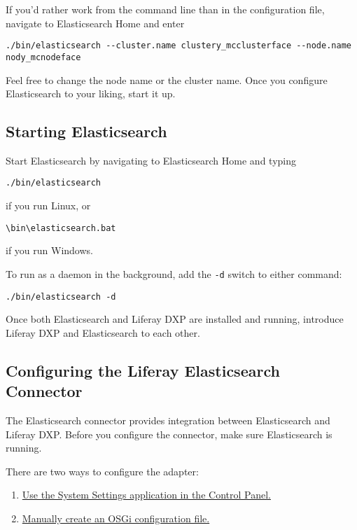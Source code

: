 If you'd rather work from the command line than in the configuration
file, navigate to Elasticsearch Home and enter

\begin{verbatim}
./bin/elasticsearch --cluster.name clustery_mcclusterface --node.name nody_mcnodeface
\end{verbatim}

Feel free to change the node name or the cluster name. Once you
configure Elasticsearch to your liking, start it up.

\subsection{Starting Elasticsearch}\label{starting-elasticsearch-1}

Start Elasticsearch by navigating to Elasticsearch Home and typing

\begin{verbatim}
./bin/elasticsearch
\end{verbatim}

if you run Linux, or

\begin{verbatim}
\bin\elasticsearch.bat
\end{verbatim}

if you run Windows.

To run as a daemon in the background, add the \texttt{-d} switch to
either command:

\begin{verbatim}
./bin/elasticsearch -d
\end{verbatim}

Once both Elasticsearch and Liferay DXP are installed and running,
introduce Liferay DXP and Elasticsearch to each other.

\subsection{Configuring the Liferay Elasticsearch
Connector}\label{configuring-the-liferay-elasticsearch-connector-2}

The Elasticsearch connector provides integration between Elasticsearch
and Liferay DXP. Before you configure the connector, make sure
Elasticsearch is running.

There are two ways to configure the adapter:

\begin{enumerate}
\def\labelenumi{\arabic{enumi}.}
\item
  \hyperref[configuring-the-adapter-in-the-control-panel]{Use the System
  Settings application in the Control Panel.}
\item
  \hyperref[configuring-the-adapter-with-an-osgi-config-file]{Manually
  create an OSGi configuration file.}
\end{enumerate}

